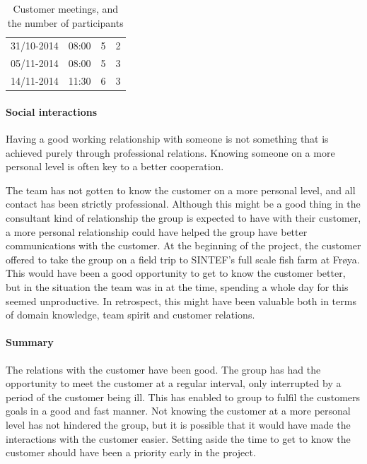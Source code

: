 \documentclass[11pt,a4paper,titlepage,oneside]{report}
\begin{document}
\begin{table}
\begin{center}
\begin{tabular}{llcc}
31/10-2014               & 08:00                     & 5                                                                & 2                                                                           \\
05/11-2014                & 08:00                     & 5                                                                & 3                                                                           \\
14/11-2014               & 11:30                          & 6                                                                 &  3                                                                          
\end{tabular}
\caption{Customer meetings, and the number of participants}
\label{tab:CustomerMeetings}
\end{center}
\end{table}

\paragraph{Social interactions}
Having a good working relationship with someone is not something that is achieved purely through professional relations. Knowing someone on a more personal level is often key to a better cooperation. 

The team has not gotten to know the customer on a more personal level, and all contact has been strictly professional. Although this might be a good thing in the consultant kind of relationship the group is expected to have with their customer, a more personal relationship could have helped the group have better communications with the customer. At the beginning of the project, the customer offered to take the group on a field trip to SINTEF's full scale fish farm at Frøya. This would have been a good opportunity to get to know the customer better, but in the situation the team was in at the time, spending a whole day for this seemed unproductive. In retrospect, this might have been valuable both in terms of domain knowledge, team spirit and customer relations. 

\paragraph{Summary}
The relations with the customer have been good. The group has had the opportunity to meet the customer at a regular interval, only interrupted by a period of the customer being ill. This has enabled to group to fulfil the customers goals in a good and fast manner. Not knowing the customer at a more personal level has not hindered the group, but it is possible that it would have made the interactions with the customer easier. Setting aside the time to get to know the customer should have been a priority early in the project. 
\end{document}
